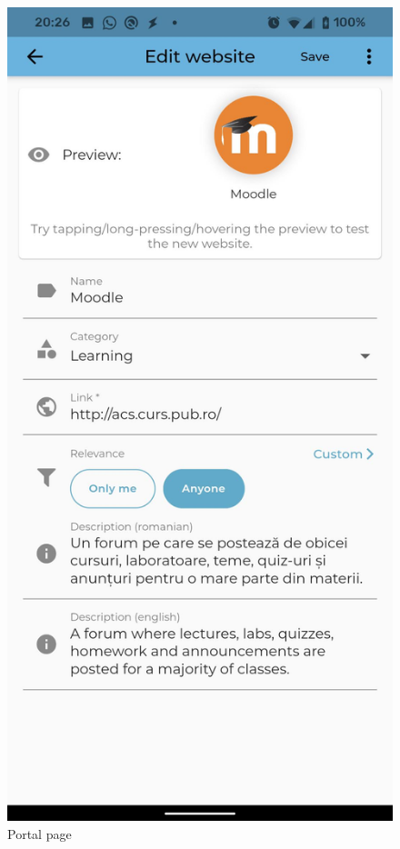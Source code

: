 \begin{figure}[!ht]
\begin{minipage}[b]{0.26\textwidth}
        \caption{Portal page}
        \label{4:fig:portal}
    \end{minipage}
    \hfill
    \begin{minipage}[b]{0.26\textwidth}
        \captionsetup{justification=centering}
        \includegraphics[width=\textwidth]{figures/app/flutter/website.jpg}

\end{minipage}
\end{figure}
